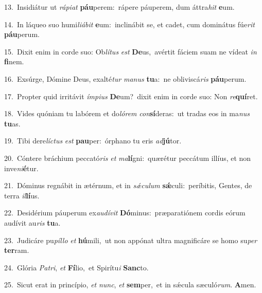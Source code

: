{\numbfont\textcolor{\numbcolor}{13.}}~Insidiátur ut \textit{rá}\-\textit{pi}\textit{at} \textbf{páu}\-perem:~\star rápere páuperem, dum áttra\textit{hit} \textbf{e}\-um.\par
{\numbfont\textcolor{\numbcolor}{14.}}~In láqueo suo humi\-\textit{li}\-\textit{á}\textit{bit} \textbf{e}\-um:~\star inclinábit se, et cadet, cum dominátus fúe\textit{rit} \textbf{páu}\-perum.\par
{\numbfont\textcolor{\numbcolor}{15.}}~Dixit enim in corde suo: Ob\-\textit{lí}\-\textit{tus} \textit{est} \textbf{De}\-us,~\star avértit fáciem suam ne vídeat \textit{in} \textbf{fi}\-nem.\par
{\numbfont\textcolor{\numbcolor}{16.}}~Exsúrge, Dómine Deus, exalté\textit{tur} \textit{ma}\-\textit{nus} \textbf{tu}\-a:~\star ne obliviscá\textit{ris} \textbf{páu}\-perum.\par
{\numbfont\textcolor{\numbcolor}{17.}}~Propter quid irritávit \textit{ím}\-\textit{pi}\textit{us} \textbf{De}\-um?~\star dixit enim in corde suo: Non \textit{re}\-\textbf{quí}ret.\par
{\numbfont\textcolor{\numbcolor}{18.}}~Vides quóniam tu labórem et do\-\textit{ló}\-\textit{rem} \textit{con}\-\textbf{sí}deras:~\star ut tradas eos in ma\textit{nus} \textbf{tu}\-as.\par
{\numbfont\textcolor{\numbcolor}{19.}}~Tibi dere\-\textit{líc}\-\textit{tus} \textit{est} \textbf{pau}\-per:~\star órphano tu eris \textit{ad}\-\textbf{jú}tor.\par
{\numbfont\textcolor{\numbcolor}{20.}}~Cóntere bráchium peccató\textit{ris} \textit{et} \textit{ma}\-\textbf{lí}gni:~\star quærétur peccátum illíus, et non inve\-\textit{ni}\-\textbf{é}tur.\par
{\numbfont\textcolor{\numbcolor}{21.}}~Dóminus regnábit in ætérnum, et in \textit{sǽ}\-\textit{cu}\textit{lum} \textbf{sǽ}\-culi:~\star períbitis, Gentes, de terra \textit{il}\-\textbf{lí}us.\par
{\numbfont\textcolor{\numbcolor}{22.}}~Desidérium páuperum ex\-\textit{au}\-\textit{dí}\textit{vit} \textbf{Dó}\-minus:~\star præparatiónem cordis eórum audívit au\textit{ris} \textbf{tu}\-a.\par
{\numbfont\textcolor{\numbcolor}{23.}}~Judicáre pu\-\textit{píl}\-\textit{lo} \textit{et} \textbf{hú}\-mili,~\star ut non appónat ultra magnificáre se homo su\textit{per} \textbf{ter}\-ram.\par
{\numbfont\textcolor{\numbcolor}{24.}}~Glória \textit{Pa}\-\textit{tri}, \textit{et} \textbf{Fí}\-lio,~\star et Spirítu\textit{i} \textbf{Sanc}\-to.\par
{\numbfont\textcolor{\numbcolor}{25.}}~Sicut erat in princípio, \textit{et} \textit{nunc}\-, \textit{et} \textbf{sem}\-per,~\star et in sǽcula sæculó\-\textit{rum}\-. \textbf{A}\-men.\par

